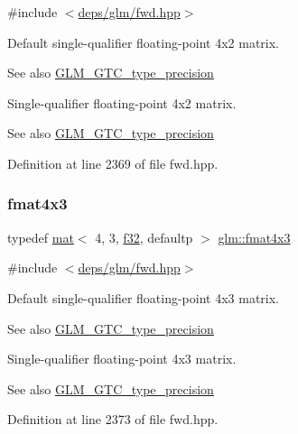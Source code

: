 {\ttfamily \#include $<$\hyperlink{fwd_8hpp}{deps/glm/fwd.\+hpp}$>$}

Default single-\/qualifier floating-\/point 4x2 matrix. \begin{DoxySeeAlso}{See also}
\hyperlink{group__gtc__type__precision}{G\+L\+M\+\_\+\+G\+T\+C\+\_\+type\+\_\+precision}
\end{DoxySeeAlso}
Single-\/qualifier floating-\/point 4x2 matrix. \begin{DoxySeeAlso}{See also}
\hyperlink{group__gtc__type__precision}{G\+L\+M\+\_\+\+G\+T\+C\+\_\+type\+\_\+precision} 
\end{DoxySeeAlso}


Definition at line 2369 of file fwd.\+hpp.

\mbox{\label{group__gtc__type__precision_ga0ab797a258612fe48345951a0bdd6b8c}} 
\subsubsection{\texorpdfstring{fmat4x3}{fmat4x3}}
{\footnotesize\ttfamily typedef \hyperlink{structglm_1_1mat}{mat}$<$ 4, 3, \hyperlink{group__gtc__type__precision_ga0ec999b57f5330d9021256e96038df04}{f32}, defaultp $>$ \hyperlink{group__gtc__type__precision_ga0ab797a258612fe48345951a0bdd6b8c}{glm\+::fmat4x3}}



{\ttfamily \#include $<$\hyperlink{fwd_8hpp}{deps/glm/fwd.\+hpp}$>$}

Default single-\/qualifier floating-\/point 4x3 matrix. \begin{DoxySeeAlso}{See also}
\hyperlink{group__gtc__type__precision}{G\+L\+M\+\_\+\+G\+T\+C\+\_\+type\+\_\+precision}
\end{DoxySeeAlso}
Single-\/qualifier floating-\/point 4x3 matrix. \begin{DoxySeeAlso}{See also}
\hyperlink{group__gtc__type__precision}{G\+L\+M\+\_\+\+G\+T\+C\+\_\+type\+\_\+precision} 
\end{DoxySeeAlso}


Definition at line 2373 of file fwd.\+hpp.

\mbox{\label{group__gtc__type__precision_gaeda4baa9a8e3113ff879dd5e7bdf5334}} 
